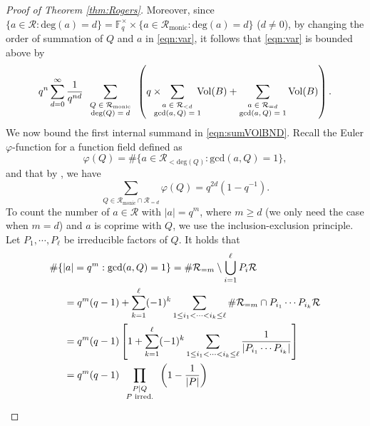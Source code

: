 \documentclass[11pt,a4paper,reqno]{amsart}
\def\gcd{\mathrm{gcd}}
\def\deg{\mathrm{deg}}
\newcommand{\Rmo}{\mathcal R_{\text{monic}}}
\theoremstyle{definition}
\theoremstyle{remark}
\numberwithin{equation}{section}
\begin{document}
\begin{proof}[Proof of Theorem \ref{thm:Rogers}]
Moreover, since $\{a\in \mathcal R: \deg(a)=d\}=\mathbb F_q^{\times} \times \{a\in \Rmo: \deg(a)=d\}$ ($d\neq 0$), by changing the order of summation of $Q$ and $a$ in \eqref{eqn:var}, it follows that \eqref{eqn:var} is bounded above by
\begin{equation}
\label{eqn:sumVOlBND}
    q^n\sum_{d=0}^{\infty}\frac{1}{q^{nd}}
    \sum_{\scriptsize \begin{array}{c}
    Q\in \Rmo\\
    \deg(Q)=d\end{array}}\left(q\times \hspace{-0.2in}\sum_{\scriptsize \begin{array}{c}
    a\in \mathcal{R}_{< d}\\
    \gcd(a,Q)=1\end{array}}\hspace{-0.15in}\operatorname{Vol}(B)+\sum_{\scriptsize\begin{matrix}
        a\in \mathcal R_{=d}\\
        \gcd(a,Q)=1
    \end{matrix}}
    \operatorname{Vol}(B)\right).
\end{equation}
We now bound the first internal summand in \eqref{eqn:sumVOlBND}. Recall the Euler $\varphi$-function for a function field defined as
$$\varphi(Q)=\#\{a\in \mathcal{R}_{<\deg(Q)}: \gcd(a,Q)=1\},$$ 
and that by \cite[Proposition 2.7]{Ros}, we have 
$$\sum_{Q\in \mathcal{R}_{\text{monic}}\cap \mathcal{R}_{=d}}\varphi(Q)=q^{2d}(1-q^{-1}).$$ 
To count the number of $a\in \mathcal R$ with $\vert a\vert=q^m$, where $m\ge d$ (we only need the case when $m=d$) and $a$ is coprime with $Q$, we use the inclusion-exclusion principle. Let $P_1, \cdots, P_{\ell}$ be irreducible factors of $Q$. It holds that
\begin{equation}
\begin{split}
\label{eqn:CoprimeGenDeg}
   &\#\{\vert a\vert=q^m:\gcd(a,Q)=1\}
   =\#\mathcal{R}_{=m}\setminus \bigcup_{i=1}^{\ell}P_i\mathcal{R}\\
   &\hspace{0.2in}=q^m(q-1)+\sum_{k=1}^{\ell}(-1)^k\sum_{1\leq i_1<\dots<i_k\leq \ell}\#\mathcal{R}_{=m}\cap P_{i_1}\cdots P_{i_k}\mathcal{R}\\
   &\hspace{0.2in}=q^m(q-1)\left[1+\sum_{k=1}^{\ell}(-1)^k\sum_{1\leq i_1<\cdots <i_k\leq \ell}\frac{1}{\vert P_{i_1}\cdots P_{i_k}\vert}\right]\\
   &\hspace{0.2in}=q^m(q-1)\prod_{ \scriptsize \begin{array}{c} P|Q\\ P\text{ irred.}\end{array}}\left(1-\frac{1}{\vert P\vert}\right)

\end{split}
\end{equation}
\end{proof}
\end{document}
